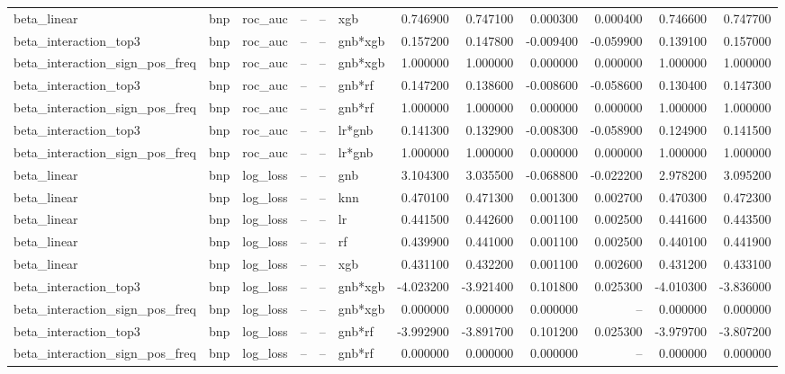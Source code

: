 \begin{landscape}
\begin{longtable}{llllllrrrrrr}
beta\_linear & bnp & roc\_auc & -- & -- & xgb & 0.746900 & 0.747100 & 0.000300 & 0.000400 & 0.746600 & 0.747700 \\
beta\_interaction\_top3 & bnp & roc\_auc & -- & -- & gnb*xgb & 0.157200 & 0.147800 & -0.009400 & -0.059900 & 0.139100 & 0.157000 \\
beta\_interaction\_sign\_pos\_freq & bnp & roc\_auc & -- & -- & gnb*xgb & 1.000000 & 1.000000 & 0.000000 & 0.000000 & 1.000000 & 1.000000 \\
beta\_interaction\_top3 & bnp & roc\_auc & -- & -- & gnb*rf & 0.147200 & 0.138600 & -0.008600 & -0.058600 & 0.130400 & 0.147300 \\
beta\_interaction\_sign\_pos\_freq & bnp & roc\_auc & -- & -- & gnb*rf & 1.000000 & 1.000000 & 0.000000 & 0.000000 & 1.000000 & 1.000000 \\
beta\_interaction\_top3 & bnp & roc\_auc & -- & -- & lr*gnb & 0.141300 & 0.132900 & -0.008300 & -0.058900 & 0.124900 & 0.141500 \\
beta\_interaction\_sign\_pos\_freq & bnp & roc\_auc & -- & -- & lr*gnb & 1.000000 & 1.000000 & 0.000000 & 0.000000 & 1.000000 & 1.000000 \\
beta\_linear & bnp & log\_loss & -- & -- & gnb & 3.104300 & 3.035500 & -0.068800 & -0.022200 & 2.978200 & 3.095200 \\
beta\_linear & bnp & log\_loss & -- & -- & knn & 0.470100 & 0.471300 & 0.001300 & 0.002700 & 0.470300 & 0.472300 \\
beta\_linear & bnp & log\_loss & -- & -- & lr & 0.441500 & 0.442600 & 0.001100 & 0.002500 & 0.441600 & 0.443500 \\
beta\_linear & bnp & log\_loss & -- & -- & rf & 0.439900 & 0.441000 & 0.001100 & 0.002500 & 0.440100 & 0.441900 \\
beta\_linear & bnp & log\_loss & -- & -- & xgb & 0.431100 & 0.432200 & 0.001100 & 0.002600 & 0.431200 & 0.433100 \\
beta\_interaction\_top3 & bnp & log\_loss & -- & -- & gnb*xgb & -4.023200 & -3.921400 & 0.101800 & 0.025300 & -4.010300 & -3.836000 \\
beta\_interaction\_sign\_pos\_freq & bnp & log\_loss & -- & -- & gnb*xgb & 0.000000 & 0.000000 & 0.000000 & -- & 0.000000 & 0.000000 \\
beta\_interaction\_top3 & bnp & log\_loss & -- & -- & gnb*rf & -3.992900 & -3.891700 & 0.101200 & 0.025300 & -3.979700 & -3.807200 \\
beta\_interaction\_sign\_pos\_freq & bnp & log\_loss & -- & -- & gnb*rf & 0.000000 & 0.000000 & 0.000000 & -- & 0.000000 & 0.000000 \\

\end{longtable}
\end{landscape}
